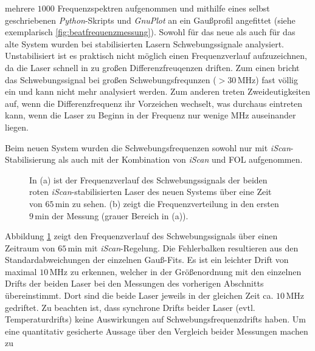 mehrere $1000$ Frequenzspektren aufgenommen und mithilfe eines selbst
geschriebenen \textit{Python}-Skripts und \textit{GnuPlot} an ein Gaußprofil
angefittet (siehe exemplarisch
\ref{fig:beatfrequenzmessung}).
Sowohl für das neue als auch für das alte System wurden bei stabilisierten
Lasern Schwebungssignale analysiert. Unstabilisiert ist es praktisch nicht
möglich einen Frequenzverlauf aufzuzeichnen, da die Laser schnell in zu
großen Differenzfreuqenzen driften. Zum einen bricht das Schwebungssignal
bei großen Schwebungsfrequnzen ($>30\,$MHz) fast völlig ein und kann nicht mehr
analysiert werden. Zum anderen treten Zweideutigkeiten auf, wenn die
Differenzfrequenz ihr Vorzeichen wechselt, was durchaus eintreten kann, wenn die
Laser zu Beginn in der Frequenz nur wenige MHz auseinander liegen.\par
Beim neuen System wurden die Schwebungsfrequenzen sowohl nur mit
\textit{iScan}-Stabilisierung als auch mit der Kombination von \textit{iScan}
und FOL aufgenommen.
\begin{figure}[hp]
 	\centering
 	\footnotesize
 	\fbox{\parbox{\dimexpr \linewidth - 2\fboxrule - 2\fboxsep}{
 	\subfloat[]{
		\label{subfig:beatfrequenzen_neu_iScan_drift}
		
		}\\
 	\subfloat[]{
		\label{subfig:beatfrequenzen_neu_iScan_histogramm}
		
		}
	}}
	\caption[Beatfrequenzen - neues System mit \textit{iScan}]{In (a) ist der
	Frequenzverlauf des Schwebungssignals der beiden roten
	\textit{iScan}-stabilisierten Laser des neuen Systems über eine Zeit von
	$65\,$min zu sehen.
	(b) zeigt die Frequenzverteilung in den ersten $9\,$min der Messung (grauer Bereich in (a)).}
	\label{fig:beatfrequenzen_neu_iScan}
\end{figure}
Abbildung
\ref{fig:beatfrequenzen_neu_iScan} zeigt den Frequenzverlauf des Schwebungssignals über einen Zeitraum von $65\,$min mit
\textit{iScan}-Regelung. Die Fehlerbalken resultieren aus den
Standardabweichungen der einzelnen Gauß-Fits. Es ist ein leichter Drift von
maximal $10\,$MHz zu erkennen, welcher in der Größenordnung mit den
einzelnen Drifts der beiden Laser bei den Messungen des vorherigen Abschnitts
übereinstimmt. Dort sind die beide Laser jeweils in der gleichen Zeit ca.
$10\,$MHz gedriftet. Zu beachten ist, dass synchrone Drifts beider Laser (evtl.
Temperaturdrifts) keine Auswirkungen auf Schwebungsfrequenzdrifts haben. Um eine
quantitativ gesicherte Aussage über den Vergleich beider Messungen machen zu
